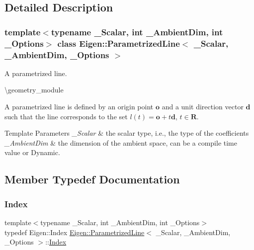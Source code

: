 \subsection{Detailed Description}
\subsubsection*{template$<$typename \+\_\+\+Scalar, int \+\_\+\+Ambient\+Dim, int \+\_\+\+Options$>$\newline
class Eigen\+::\+Parametrized\+Line$<$ \+\_\+\+Scalar, \+\_\+\+Ambient\+Dim, \+\_\+\+Options $>$}

A parametrized line. 

\textbackslash{}geometry\+\_\+module

A parametrized line is defined by an origin point $ \mathbf{o} $ and a unit direction vector $ \mathbf{d} $ such that the line corresponds to the set $ l(t) = \mathbf{o} + t \mathbf{d} $, $ t \in \mathbf{R} $.


\begin{DoxyTemplParams}{Template Parameters}
{\em \+\_\+\+Scalar} & the scalar type, i.\+e., the type of the coefficients \\
\hline
{\em \+\_\+\+Ambient\+Dim} & the dimension of the ambient space, can be a compile time value or Dynamic. \\
\hline
\end{DoxyTemplParams}


\subsection{Member Typedef Documentation}
\mbox{\label{class_eigen_1_1_parametrized_line_a3c9f84dd8608940282b16652a296c764}} 
\subsubsection{\texorpdfstring{Index}{Index}}
{\footnotesize\ttfamily template$<$typename \+\_\+\+Scalar, int \+\_\+\+Ambient\+Dim, int \+\_\+\+Options$>$ \\
typedef Eigen\+::\+Index \mbox{\hyperlink{class_eigen_1_1_parametrized_line}{Eigen\+::\+Parametrized\+Line}}$<$ \+\_\+\+Scalar, \+\_\+\+Ambient\+Dim, \+\_\+\+Options $>$\+::\mbox{\hyperlink{class_eigen_1_1_parametrized_line_a3c9f84dd8608940282b16652a296c764}{Index}}}

